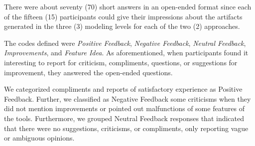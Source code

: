 There were about seventy (70) short answers in an open-ended format since each of the fifteen (15) participants could give their impressions about the artifacts generated in the three (3) modeling levels for each of the two (2) approaches.

The codes defined were \textit{Positive Feedback}, \textit{Negative Feedback}, \textit{Neutral Feedback}, \textit{Improvements}, and \textit{Feature Idea}.
As aforementioned, when participants found it interesting to report for criticism, compliments, questions, or suggestions for improvement, they answered the open-ended questions.

We categorized compliments and reports of satisfactory experience as Positive Feedback.
Further, we classified as Negative Feedback some criticisms when they did not mention improvements or pointed out malfunctions of some features of the tools.
Furthermore, we grouped Neutral Feedback responses that indicated that there were no suggestions, criticisms, or compliments, only reporting vague or ambiguous opinions.

